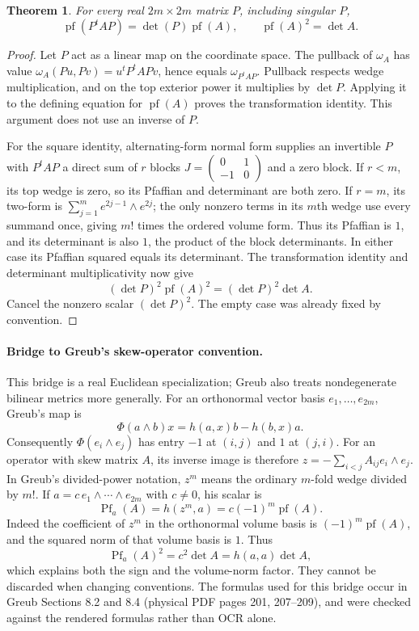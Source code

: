 \documentclass[11pt,a4paper]{book}
\newtheorem{theorem}{Theorem}[chapter]
\theoremstyle{definition}\newtheorem{definition}[theorem]{Definition}
\theoremstyle{remark}\newtheorem{remark}[theorem]{Remark}
\DeclareMathOperator{\Pf}{pf}\DeclareMathOperator{\codim}{codim}
\begin{document}
\begin{theorem}
For every real $2m\times2m$ matrix $P$, including singular $P$,
\[\Pf(P^tAP)=\det(P)\Pf(A),\qquad \Pf(A)^2=\det A.
\]
\end{theorem}
\begin{proof}
Let $P$ act as a linear map on the coordinate space. The pullback of $\omega_A$ has value $\omega_A(Pu,Pv)=u^tP^tAPv$, hence equals $\omega_{P^tAP}$. Pullback respects wedge multiplication, and on the top exterior power it multiplies by $\det P$. Applying it to the defining equation for $\Pf(A)$ proves the transformation identity. This argument does not use an inverse of $P$.

For the square identity, alternating-form normal form supplies an invertible $P$ with $P^tAP$ a direct sum of $r$ blocks $J=\begin{pmatrix}0&1\\-1&0\end{pmatrix}$ and a zero block. If $r<m$, its top wedge is zero, so its Pfaffian and determinant are both zero. If $r=m$, its two-form is $\sum_{j=1}^m e^{2j-1}\wedge e^{2j}$; the only nonzero terms in its $m$th wedge use every summand once, giving $m!$ times the ordered volume form. Thus its Pfaffian is $1$, and its determinant is also $1$, the product of the block determinants. In either case its Pfaffian squared equals its determinant. The transformation identity and determinant multiplicativity now give
\[(\det P)^2\Pf(A)^2=(\det P)^2\det A.
\]
Cancel the nonzero scalar $(\det P)^2$. The empty case was already fixed by convention.
\end{proof}

\paragraph{Bridge to Greub's skew-operator convention.}
This bridge is a real Euclidean specialization; Greub also treats nondegenerate bilinear metrics more generally. For an orthonormal vector basis $e_1,\ldots,e_{2m}$, Greub's map is
\[\Phi(a\wedge b)x=h(a,x)b-h(b,x)a.
\]
Consequently $\Phi(e_i\wedge e_j)$ has entry $-1$ at $(i,j)$ and $1$ at $(j,i)$. For an operator with skew matrix $A$, its inverse image is therefore $z=-\sum_{i<j}A_{ij}e_i\wedge e_j$. In Greub's divided-power notation, $z^m$ means the ordinary $m$-fold wedge divided by $m!$. If $a=c\,e_1\wedge\cdots\wedge e_{2m}$ with $c\ne0$, his scalar is
\[\operatorname{Pf}_a(A)=h(z^m,a)=c(-1)^m\Pf(A).
\]
Indeed the coefficient of $z^m$ in the orthonormal volume basis is $(-1)^m\Pf(A)$, and the squared norm of that volume basis is $1$. Thus
\[\operatorname{Pf}_a(A)^2=c^2\det A=h(a,a)\det A,
\]
which explains both the sign and the volume-norm factor. They cannot be discarded when changing conventions. The formulas used for this bridge occur in Greub Sections 8.2 and 8.4 (physical PDF pages 201, 207--209), and were checked against the rendered formulas rather than OCR alone.
\end{document}
